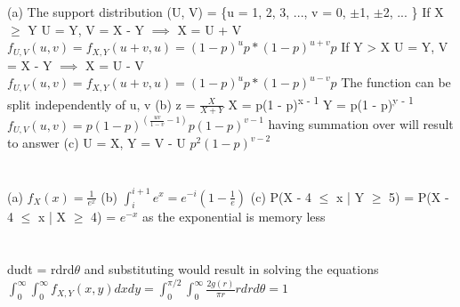 \documentclass{report}
\begin{document}
\section{}
(a) The support distribution (U, V) = \{u = 1, 2, 3, ..., v = 0, $\pm$1, $\pm$2, ... \}
\newline
If X $\ge$ Y
U = Y, V = X - Y $\implies$ X = U + V
$f_{U, V}(u, v) = f_{X, Y}(u+v, u) = (1 - p)^up * (1 - p)^{u + v}p$
\newline
If Y > X
U = Y, V = X - Y $\implies$ X = U - V
$f_{U, V}(u, v) = f_{X, Y}(u+v, u) = (1 - p)^up * (1 - p)^{u - v}p$
\newline
The function can be split independently of u, v
\newline
(b) z = $\frac{X}{X + Y}$
\newline
X = p(1 - p)\textsuperscript{x - 1} \quad Y = p(1 - p)\textsuperscript{y - 1}
\newline
$f_{U, V}(u, v) = p(1 - p)^{\left(\frac{uv}{1 - v} - 1\right)}p(1 - p)^{v - 1}$
\newline
having summation over will result to answer
\newline
(c) U = X, Y = V - U
\newline
$p^2(1 - p)^{v - 2}$
\newline
\section{} 
(a) $f_X(x) = \frac{1}{e^x}$
\newline
(b) $\int_{i}^{i+1}e^x = e^{-i}(1 - \frac{1}{e})$
\newline
(c) P(X - 4 $\le$ x | Y $\ge$ 5) = P(X - 4 $\le$ x | X $\ge$ 4) = $e^{-x}$ as the exponential is memory less
\newline
\section{}
dudt = rdrd$\theta$
\newline
and substituting would result in solving the equations
\newline
$\int_{0}^{\infty}\int_{0}^{\infty}f_{X, Y}(x, y)dxdy = \int_{0}^{\pi/2}\int_{0}^{\infty}\frac{2g(r)}{\pi r}rdrd\theta = 1$
\newline
\end{document}
